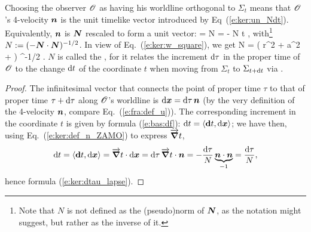 Choosing the observer $\mathscr{O}$ as having his worldline orthogonal to $\Sigma_t$
means that $\mathscr{O}$'s 4-velocity $\bm{n}$ is the unit timelike vector introduced
by Eq~(\ref{e:ker:un_Ndt}). Equivalently, $\bm{n}$ is $\bm{N}$ rescaled to form a unit vector:
\be \label{e:ker:def_n_ZAMO}
     = N  = - N \vw{\nabla} t ,
\ee
with\footnote{Note that $N$ is not defined as the (pseudo)norm of $\bm{N}$, as the notation might suggest, but rather as the inverse of it.} $N := (-\bm{N}\cdot\bm{N})^{-1/2}$.
In view of Eq.~(\ref{e:ker:w_square}), we get
\be \label{e:ker:lapse_ZAMO}
    N = \sqrt{\Delta} \left( r^2 + a^2 +  \right) ^{-1/2} .
\ee
$N$ is called the , for it relates the increment $\mathrm{d}\tau$
in the proper time of $\mathscr{O}$ to the change $\mathrm{d} t$ of the coordinate $t$ when moving from $\Sigma_{t}$ to $\Sigma_{t + \mathrm{d} t}$ via
\be \label{e:ker:dtau_lapse}
    .
\ee
\begin{proof}
The infinitesimal vector that connects the point of proper time $\tau$ to that of proper time $\tau+\mathrm{d}\tau$ along $\mathscr{O}$'s worldline is $\mathrm{d} \bm{x} = \mathrm{d}\tau\,  \bm{n}$ (by the very definition of the 4-velocity $\bm{n}$, compare Eq.~(\ref{e:fra:def_u})). The corresponding increment in the coordinate $t$ is given by
formula (\ref{e:bas:df}): $\mathrm{d} t = \langle \mathbf{d} t, \mathrm{d} \bm{x} \rangle$; we have then, using Eq.~(\ref{e:ker:def_n_ZAMO}) to express $\overrightarrow{\bm{\nabla}} t$,
\[
    \mathrm{d} t = \langle \mathbf{d} t, \mathrm{d} \bm{x} \rangle = \overrightarrow{\bm{\nabla}} t \cdot \mathrm{d} \bm{x} = \mathrm{d}\tau \, \overrightarrow{\bm{\nabla}} t \cdot \bm{n}
    = - \frac{\mathrm{d}\tau}{N} \underbrace{\bm{n}\cdot\bm{n}}_{-1} = \frac{\mathrm{d}\tau}{N} ,
\]
hence formula (\ref{e:ker:dtau_lapse}).
\end{proof}

